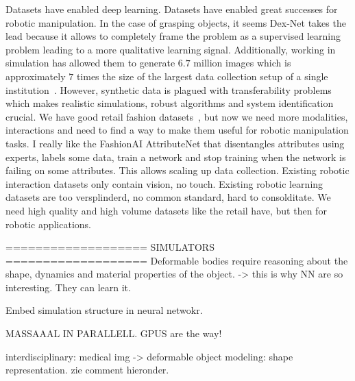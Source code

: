 \documentclass[\home/main.tex]{subfiles}
\begin{document}
Datasets have enabled deep learning. Datasets have enabled great successes for robotic manipulation. In the case of grasping objects, it seems Dex-Net takes the lead because it allows to completely frame the problem as a supervised learning problem leading to a more qualitative learning signal. Additionally, working in simulation has allowed them to generate $6.7$ million images which is approximately $7$ times the size of the largest data collection setup of a single institution~\autocite{Levine2016}. However, synthetic data is plagued with transferability problems which makes realistic simulations, robust algorithms and system identification crucial. 
We have good retail fashion datasets~\autocite{DeepFashion, DeepFashion2, FashionAI}, but now we need more modalities, interactions and need to find a way to make them useful for robotic manipulation tasks. 
I really like the FashionAI AttributeNet that disentangles attributes using experts, labels some data, train a network and stop training when the network is failing on some attributes. This allows scaling up data collection.
Existing robotic interaction datasets only contain vision, no touch. 
Existing robotic learning datasets are too versplinderd, no common standard, hard to consolditate. 
We need high quality and high volume datasets like the retail have, but then for robotic applications. 

===================
SIMULATORS 
===================
Deformable bodies require reasoning about the shape, dynamics and material properties of the object. -> this is why NN are so interesting. They can learn it.

Embed simulation structure in neural netwokr. 

MASSAAAL IN PARALLELL. GPUS are the way!

interdisciplinary: medical img -> deformable object modeling: shape representation. zie comment hieronder.
\end{document}
